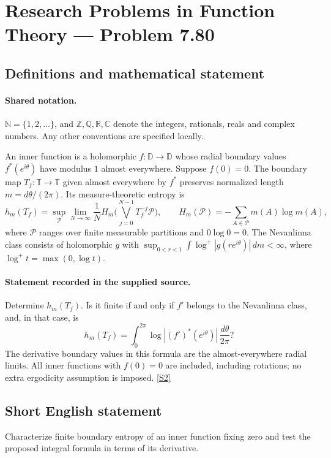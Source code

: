 \documentclass[11pt]{article}
\newcommand{\sref}[2]{\hyperlink{source:#1:#2}{[S#2]}}
\begin{document}
\section{Research Problems in Function Theory — Problem 7.80}\label{statement}

\subsection{Definitions and mathematical statement}

\paragraph{Shared notation.}$\mathbb N=\{1,2,\ldots\}$, and $\mathbb Z,\mathbb Q,\mathbb R,\mathbb C$ denote the integers, rationals, reals and complex numbers. Any other conventions are specified locally.


An inner function is a holomorphic $f:\mathbb D\to\mathbb D$ whose radial boundary values $f^*(e^{i\theta})$ have modulus $1$ almost everywhere. Suppose $f(0)=0$. The boundary map $T_f:\mathbb T\to\mathbb T$ given almost everywhere by $f^*$ preserves normalized length $m=d\theta/(2\pi)$. Its measure-theoretic entropy is
\[h_m(T_f)=\sup_{\mathcal P}\lim_{N\to\infty}\frac1N
H_m\Big(\bigvee_{j=0}^{N-1}T_f^{-j}\mathcal P\Big),
\qquad H_m(\mathcal P)=-\sum_{A\in\mathcal P}m(A)\log m(A),
\]
where $\mathcal P$ ranges over finite measurable partitions and $0\log0=0$. The Nevanlinna class consists of holomorphic $g$ with $\sup_{0<r<1}\int\log^+|g(re^{i\theta})|\,dm<\infty$, where $\log^+t=\max(0,\log t)$.
\paragraph{Statement recorded in the supplied source.}
Determine $h_m(T_f)$. Is it finite if and only if $f'$ belongs to the Nevanlinna class, and, in that case, is
\[h_m(T_f)=\int_0^{2\pi}\log|(f')^*(e^{i\theta})|\,\frac{d\theta}{2\pi}?
\]
The derivative boundary values in this formula are the almost-everywhere radial limits. All inner functions with $f(0)=0$ are included, including rotations; no extra ergodicity assumption is imposed. \sref{statement}{2}
\subsection{Short English statement}
Characterize finite boundary entropy of an inner function fixing zero and test the proposed integral formula in terms of its derivative.
\end{document}
